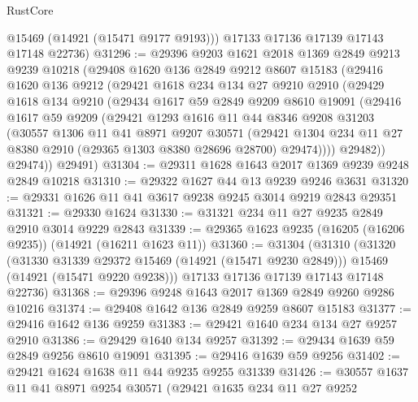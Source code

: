 \begin{lexlean}{RustCore}
\begin{coremodule}
        @15469
        (@14921 (@15471 @9177 @9193)))
      @17133
      @17136
      @17139
      @17143
      @17148
      @22736)
@31296 := @29396
    @9203
    @1621
    @2018
    @1369
    @2849
    @9213
    @9239
    @10218
    (@29408
      @1620
      @136
      @2849
      @9212
      @8607
      @15183
      (@29416
        @1620
        @136
        @9212
        (@29421
          @1618
          @234
          @134
          @27
          @9210
          @2910
          (@29429
            @1618
            @134
            @9210
            (@29434
              @1617
              @59
              @2849
              @9209
              @8610
              @19091
              (@29416
                @1617
                @59
                @9209
                (@29421
                  @1293
                  @1616
                  @11
                  @44
                  @8346
                  @9208
                  @31203
                  (@30557
                    @1306
                    @11
                    @41
                    @8971
                    @9207
                    @30571
                    (@29421
                      @1304
                      @234
                      @11
                      @27
                      @8380
                      @2910
                      (@29365 @1303 @8380 @28696 @28700)
                      @29474))))
              @29482))
          @29474))
      @29491)
@31304 := @29311 @1628 @1643 @2017 @1369 @9239 @9248 @2849 @10218
@31310 := @29322 @1627 @44 @13 @9239 @9246 @3631
@31320 := @29331 @1626 @11 @41 @3617 @9238 @9245 @3014 @9219 @2843 @29351
@31321 := @29330 @1624
@31330 := @31321 @234 @11 @27 @9235 @2849 @2910 @3014 @9229 @2843
@31339 := @29365 @1623 @9235 (@16205 (@16206 @9235)) (@14921 (@16211 @1623 @11))
@31360 := @31304
    (@31310
      (@31320
        (@31330 @31339 @29372 @15469 (@14921 (@15471 @9230 @2849)))
        @15469
        (@14921 (@15471 @9220 @9238)))
      @17133
      @17136
      @17139
      @17143
      @17148
      @22736)
@31368 := @29396 @9248 @1643 @2017 @1369 @2849 @9260 @9286 @10216
@31374 := @29408 @1642 @136 @2849 @9259 @8607 @15183
@31377 := @29416 @1642 @136 @9259
@31383 := @29421 @1640 @234 @134 @27 @9257 @2910
@31386 := @29429 @1640 @134 @9257
@31392 := @29434 @1639 @59 @2849 @9256 @8610 @19091
@31395 := @29416 @1639 @59 @9256
@31402 := @29421 @1624 @1638 @11 @44 @9235 @9255 @31339
@31426 := @30557
    @1637
    @11
    @41
    @8971
    @9254
    @30571
    (@29421
      @1635
      @234
      @11
      @27
      @9252

\end{coremodule}
\end{lexlean}
